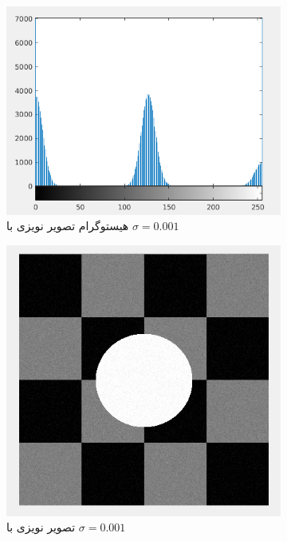 \documentclass[11.5pt,a4paper]{article}
\begin{document}
\begin{figure}[h]
\center
	\begin{subfigure}{.3\textwidth}
		\includegraphics[scale=0.2]{Imgs/NB_S001_Hist.png}
		\caption{هیستوگرام تصویر نویزی با $\sigma=0.001$}
	\end{subfigure}
	\begin{subfigure}{.3\textwidth}
		\includegraphics[scale=0.2]{Imgs/NB_S001_In.png}
		\caption{تصویر نویزی با $\sigma=0.001$}
	\end{subfigure}
	\begin{subfigure}{.3\textwidth}

\end{subfigure}
\end{figure}
\end{document}

